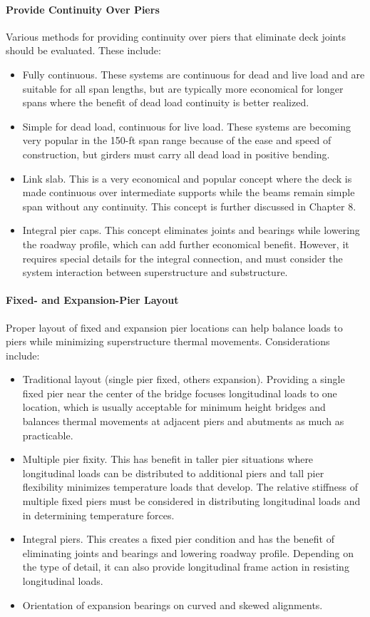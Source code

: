 \paragraph{Provide Continuity Over Piers}
Various methods for providing continuity over piers that eliminate deck joints should be evaluated. These
include:
\begin{itemize}
  \item Fully continuous. These systems are continuous for dead and live load and are suitable for all span lengths,
  but are typically more economical for longer spans where the benefit of dead load continuity is better
  realized.
  \item Simple for dead load, continuous for live load. These systems are becoming very popular in the 150-ft span
  range because of the ease and speed of construction, but girders must carry all dead load in positive bending.
  \item Link slab. This is a very economical and popular concept where the deck is made continuous over
  intermediate supports while the beams remain simple span without any continuity. This concept is further
  discussed in Chapter 8.
  \item  Integral pier caps. This concept eliminates joints and bearings while lowering the roadway profile, which
  can add further economical benefit. However, it requires special details for the integral connection, and must
  consider the system interaction between superstructure and substructure.
\end{itemize}

\paragraph{Fixed- and Expansion-Pier Layout}
Proper layout of fixed and expansion pier locations can help balance loads to piers while minimizing
superstructure thermal movements. Considerations include:
\begin{itemize}
  \item Traditional layout (single pier fixed, others expansion). Providing a single fixed pier near the center of the
  bridge focuses longitudinal loads to one location, which is usually acceptable for minimum height bridges
  and balances thermal movements at adjacent piers and abutments as much as practicable.
  \item  Multiple pier fixity. This has benefit in taller pier situations where longitudinal loads can be distributed to
  additional piers and tall pier flexibility minimizes temperature loads that develop. The relative stiffness of
  multiple fixed piers must be considered in distributing longitudinal loads and in determining temperature
  forces.
  \item  Integral piers. This creates a fixed pier condition and has the benefit of eliminating joints and bearings and
  lowering roadway profile. Depending on the type of detail, it can also provide longitudinal frame action in
  resisting longitudinal loads.
  \item  Orientation of expansion bearings on curved and skewed alignments.
\end{itemize}

